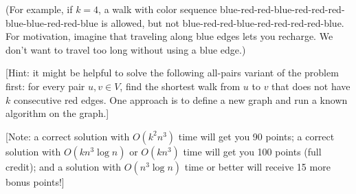 \documentclass[11pt]{article}
\begin{document}
\begin{description}
(For example, if $k=4$, a walk with color sequence blue-red-red-blue-red-red-red-blue-blue-red-red-blue is allowed, but not blue-red-red-blue-red-red-red-red-blue.  For motivation, imagine that traveling along blue edges lets you recharge.  We don't want to travel too long without using a blue edge.)

[Hint: it might be helpful to solve the following all-pairs variant of the problem first: for every pair $u,v\in V$, find the shortest walk from $u$ to $v$ that does not have $k$ consecutive red edges.  One approach is to define a new graph and run a known algorithm on the graph.]

[Note: a correct solution with $O(k^2n^3)$ time will get you 90 points; a correct solution with  $O(kn^3\log n)$ or $O(kn^3)$ time will get you 100 points (full credit); and a solution with $O(n^3\log n)$ time or better will
receive 15 more bonus points!]



\end{description}
\end{document}
